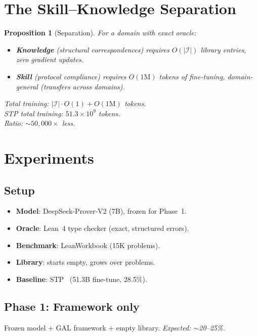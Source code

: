 \documentclass{article}
\newtheorem{proposition}[theorem]{Proposition}
\newcommand{\calI}{\mathcal{I}}
\begin{document}
\section{The Skill--Knowledge Separation}\label{sec:separation}

\begin{proposition}[Separation]\label{prop:separation}
For a domain with exact oracle:
\begin{itemize}[nosep]
  \item \textbf{Knowledge} (structural correspondences) requires
    $O(|\calI|)$ library entries, zero gradient updates.
  \item \textbf{Skill} (protocol compliance) requires
    $O(1\text{M})$ tokens of fine-tuning, domain-general
    (transfers across domains).
\end{itemize}
Total training: $|\calI| \cdot O(1) + O(1\text{M})$ tokens.\\
STP total training: $51.3 \times 10^9$ tokens.\\
Ratio: $\sim 50{,}000\times$ less.
\end{proposition}

\section{Experiments}\label{sec:experiments}

\subsection{Setup}

\begin{itemize}[nosep]
  \item \textbf{Model}: DeepSeek-Prover-V2 (7B), frozen for
    Phase~1.
  \item \textbf{Oracle}: Lean~4 type checker (exact, structured
    errors).
  \item \textbf{Benchmark}: LeanWorkbook (15K problems).
  \item \textbf{Library}: starts empty, grows over problems.
  \item \textbf{Baseline}: STP~\citep{dong2025stp} (51.3B
    fine-tune, 28.5\%).
\end{itemize}

\subsection{Phase 1: Framework only}
Frozen model + GAL framework + empty library.
\emph{Expected: $\sim$20--25\%.}
\end{document}
